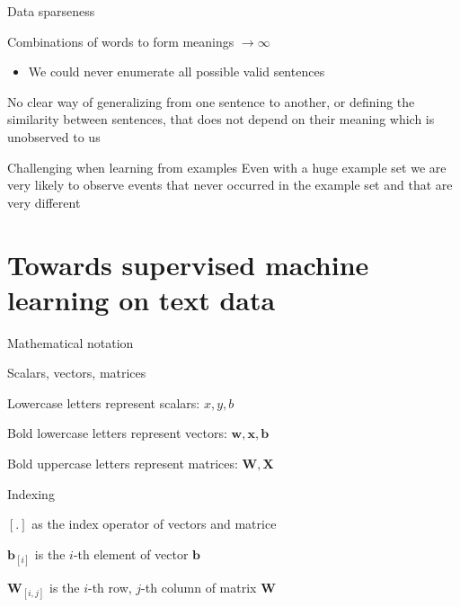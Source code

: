 \documentclass[12pt,aspectratio=169,handout]{beamer}
\begin{document}
\begin{frame}{Data sparseness}

Combinations of words to form meanings $\to \infty$

\begin{itemize}
	\item We could never enumerate all possible valid sentences
\end{itemize}


No clear way of generalizing from one sentence to another, or defining the similarity between sentences, that does not depend on their meaning which is unobserved to us


\begin{block}{Challenging when learning from examples}
Even with a huge example set we are very likely to observe events that never occurred in the example set and that are very different
\end{block}

\end{frame}

\section{Towards supervised machine learning on text data}

\begin{frame}{Mathematical notation}

\begin{block}{Scalars, vectors, matrices}

Lowercase letters represent scalars: $x, y, b$
	
Bold lowercase letters represent vectors: $\bm{w}, \bm{x}, \bm{b}$

Bold uppercase letters represent matrices: $\bm{W}, \bm{X}$

\end{block}

\begin{block}{Indexing}
	
$[ . ]$ as the index operator of vectors and matrice

$\bm{b}_{[i]}$ is the $i$-th element of vector $\bm{b}$

$\bm{W}_{[i,j]}$ is the $i$-th row, $j$-th column of matrix $\bm{W}$
\end{block}

\end{frame}
\end{document}
